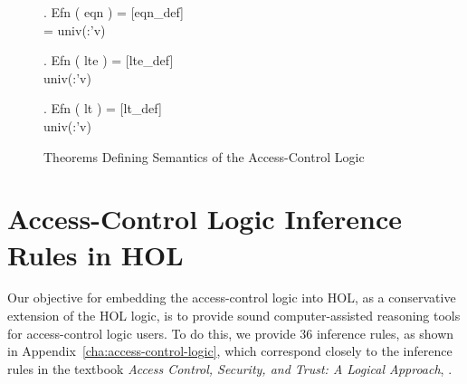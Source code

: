 \begin{figure}[t]
\begin{minipage}{1.0\linewidth}
\begin{small}
\HOLTokenTurnstile{} \HOLTokenForall{}    .
     Efn    ( eqn ) = \hfill{[eqn\_def]}\\\hspace*{0.3in}
       =   univ(:'v)  \HOLTokenLeftbrace{}\HOLTokenRightbrace{}

\HOLTokenTurnstile{} \HOLTokenForall{}    .
     Efn    ( lte ) = \hfill{[lte\_def]}\\\hspace*{0.3in}
       \HOLTokenLeq{}   univ(:'v)  \HOLTokenLeftbrace{}\HOLTokenRightbrace{}

\HOLTokenTurnstile{} \HOLTokenForall{}    .
     Efn    ( lt ) = \hfill{[lt\_def]}\\\hspace*{0.3in}
  \HOLTokenLt{}   univ(:'v)  \HOLTokenLeftbrace{}\HOLTokenRightbrace{}
\end{small}
\end{minipage}  
\caption{Theorems Defining Semantics of the Access-Control Logic}
\label{fig:acl-hol-semantics}
\end{figure}

\clearpage{}

\section{Access-Control Logic Inference Rules in HOL}
\label{sec:acl-inference-rules}

Our objective for embedding the access-control logic into HOL, as a
conservative extension of the HOL logic, is to provide sound
computer-assisted reasoning tools for access-control logic users. To
do this, we provide 36 inference rules, as shown in
Appendix~\ref{cha:access-control-logic}, which correspond closely to
the inference rules in the textbook \emph{Access Control, Security,
  and Trust: A Logical Approach}, \cite{ACST}.

